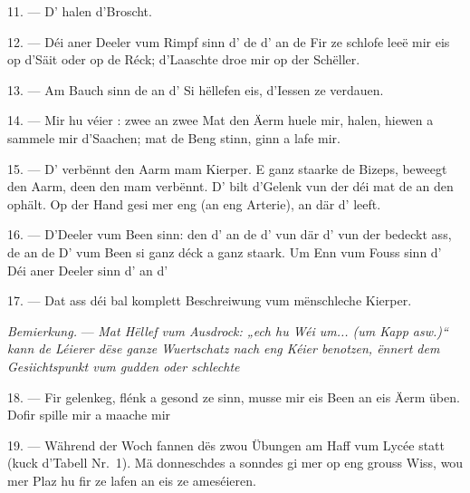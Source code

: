 11. --- D' halen d'Broscht.

12. --- Déi aner Deeler vum Rimpf sinn d' de 
d' an de  Fir ze schlofe leeë mir eis op d'Säit
oder op de Réck; d'Laaschte droe mir op der Schëller.

13. --- Am Bauch sinn de  an d' Si hëllefen eis, d'Iessen
ze verdauen.

\VUsaut{4.4mm}
\VUsaut{3.0mm}

14. --- Mir hu véier : zwee  an zwee  Mat
den Äerm huele mir, halen, hiewen a sammele mir d'Saachen; mat de Beng stinn, ginn a
lafe mir.

15. --- D' verbënnt den Aarm mam Kierper. E ganz staarke
 de Bizeps, beweegt den Aarm, deen den  mam
 verbënnt. D' bilt d'Gelenk vun der
 déi mat de  an den  ophält. Op der Hand
gesi mer eng  (an eng Arterie), an där d' leeft.

16. --- D'Deeler vum Been sinn: den  d' an de
 d' vun där d' vun der 
bedeckt ass, de  an de  D' vum Been
si ganz déck a ganz staark. Um Enn vum Fouss sinn d' Déi aner Deeler
sinn d' an d'

17. --- Dat ass déi bal komplett Beschreiwung vum mënschleche Kierper.

\textit{Bemierkung.} --- \textit{Mat Hëllef vum Ausdrock: „ech hu Wéi um... (um Kapp
asw.)“ kann de Léierer dëse ganze Wuertschatz nach eng Kéier benotzen, ënnert dem
Gesiichtspunkt vum gudden oder schlechte} 

\VUsaut{5.0mm}
\VUsaut{2.4mm}
\VUsaut{3.0mm}

18. --- Fir gelenkeg, flénk a gesond ze sinn, musse mir eis Been an eis Äerm üben.
Dofir spille mir a maache mir 

19. --- Während der Woch fannen dës zwou Übungen am Haff vum Lycée statt (kuck
d'Tabell Nr.~1). Mä donneschdes a sonndes gi mer op eng grouss Wiss, wou mer Plaz hu
fir ze lafen an eis ze ameséieren.


